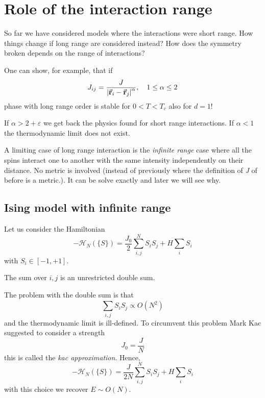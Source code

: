 \documentclass[../../Main/Main.tex]{subfiles}
\begin{document}
\section{Role of the interaction range}
So far we have considered models where the interactions were short range. How things change if long range are considered instead? How does the symmetry broken depends on the range of interactions?

One can show, for example, that if
\begin{equation}
  J_{ij} = \frac{J}{\abs{\va{r}_i - \va{r}_j}^\alpha  }, \quad 1 \le \alpha \le 2
\end{equation}
phase with long range order is stable for \( 0 < T < T_c \) also for \( d=1 \)!  

\begin{remark}
If \( \alpha > 2 + \varepsilon  \) we get back the physics found for short range interactions. If \( \alpha <1 \) the thermodynamic limit does not exist.
\end{remark}

A limiting case of long range interaction is the \emph{infinite range} case where all the spins interact one to another with the same intensity independently on their distance. No metric is involved (instead of previously where the definition of \emph{J} of before is a metric.). It can be solve exactly and later we will see why.

\subsection{Ising model with infinite range}

Let us consider the Hamiltonian 
\begin{equation}
  -\mathcal{H}_N (\{ S \} ) = \frac{J_0}{2} \sum_{i,j}^{N} S_i S_j + H \sum_{i}^{}  S_i
\end{equation}
with \( S_i \in [-1,+1] \).
\begin{remark}
The sum over \(i,j\) is an unrestricted double sum.
\end{remark}
The problem with the double sum is that
\begin{equation*}
  \sum_{i,j}^{} S_i S_j \propto O(N^2)
\end{equation*}
and the thermodynamic limit is ill-defined. To circumvent this problem Mark Kac suggested to consider a strength
\begin{equation}
  J_0 = \frac{J}{N}
\end{equation}
this is called the \emph{kac approximation}. 
Hence,
\begin{equation}
  -\mathcal{H}_N (\{ S \} ) = \frac{J}{2N} \sum_{i,j}^{N} S_i S_j + H \sum_{i}^{}  S_i
\end{equation}
with this choice we recover \( E \sim O(N) \).  
\end{document}
